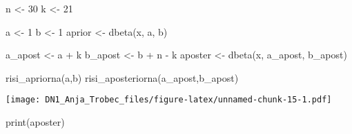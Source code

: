 \documentclass[
]{article}
\newenvironment{Shaded}{\begin{snugshade}}{\end{snugshade}}
\newcommand{\DecValTok}[1]{\textcolor[rgb]{0.00,0.00,0.81}{#1}}
\newcommand{\FunctionTok}[1]{\textcolor[rgb]{0.00,0.00,0.00}{#1}}
\newcommand{\NormalTok}[1]{#1}
\newcommand{\OtherTok}[1]{\textcolor[rgb]{0.56,0.35,0.01}{#1}}
\newcommand{\SpecialCharTok}[1]{\textcolor[rgb]{0.00,0.00,0.00}{#1}}
\begin{document}
\begin{Shaded}
\begin{Highlighting}[]
\NormalTok{n }\OtherTok{\textless{}{-}} \DecValTok{30}
\NormalTok{k }\OtherTok{\textless{}{-}} \DecValTok{21}

\NormalTok{a }\OtherTok{\textless{}{-}} \DecValTok{1}
\NormalTok{b }\OtherTok{\textless{}{-}} \DecValTok{1}
\NormalTok{aprior }\OtherTok{\textless{}{-}} \FunctionTok{dbeta}\NormalTok{(x, a, b)}

\NormalTok{a\_apost }\OtherTok{\textless{}{-}}\NormalTok{ a }\SpecialCharTok{+}\NormalTok{ k}
\NormalTok{b\_apost }\OtherTok{\textless{}{-}}\NormalTok{ b }\SpecialCharTok{+}\NormalTok{ n }\SpecialCharTok{{-}}\NormalTok{ k}
\NormalTok{aposter }\OtherTok{\textless{}{-}} \FunctionTok{dbeta}\NormalTok{(x, a\_apost, b\_apost)}

\FunctionTok{risi\_apriorna}\NormalTok{(a,b)}
\FunctionTok{risi\_aposteriorna}\NormalTok{(a\_apost,b\_apost)}
\end{Highlighting}
\end{Shaded}

\texttt{[image: DN1\_Anja\_Trobec\_files/figure-latex/unnamed-chunk-15-1.pdf]}

\begin{Shaded}
\begin{Highlighting}[]
\FunctionTok{print}\NormalTok{(aposter)}
\end{Highlighting}
\end{Shaded}
\end{document}
